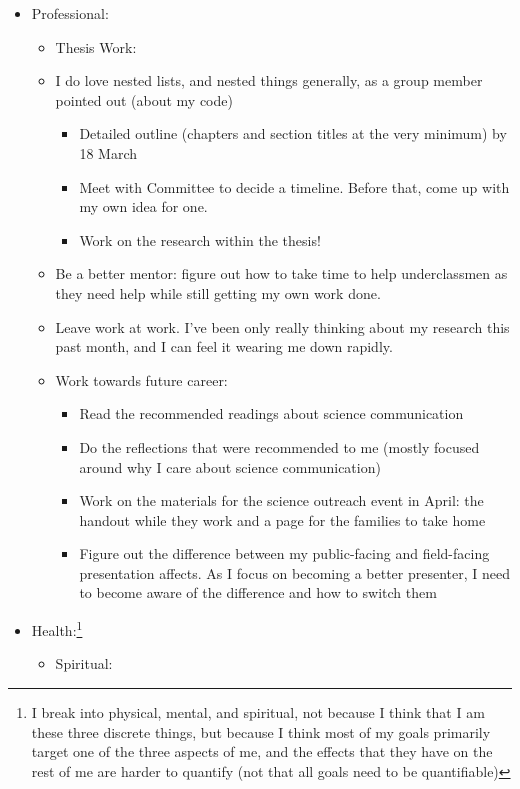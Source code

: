 \documentclass[12pt]{article}[titlepage]
\renewcommand{\,}{\textsuperscript{,}}
\begin{document}
\begin{itemize}  
\item Professional:  
\begin{itemize}  
\item Thesis Work:\item{I do love nested lists, and nested things generally, as a group member pointed out (about my code)}  
\begin{itemize}  
\item Detailed outline (chapters and section titles at the very minimum) by 18 March  
\item Meet with Committee to decide a timeline. Before that, come up with my own idea for one.  
\item Work on the research within the thesis!  
\end{itemize}  
\item Be a better mentor: figure out how to take time to help underclassmen as they need help while still getting my own work done.  
\item Leave work at work. I've been only really thinking about my research this past month, and I can feel it wearing me down rapidly.  
\item Work towards future career:  
\begin{itemize}  
\item Read the recommended readings about science communication  
\item Do the reflections that were recommended to me (mostly focused around why I care about science communication)  
\item Work on the materials for the science outreach event in April: the handout while they work and a page for the families to take home  
\item Figure out the difference between my public-facing and field-facing presentation affects. As I focus on becoming a better presenter, I need to become aware of the difference and how to switch them  
\end{itemize}  
\end{itemize}  
\item Health:\footnote{I break into physical, mental, and spiritual, not because I think that I am these three discrete things, but because I think most of my goals primarily target one of the three aspects of me, and the effects that they have on the rest of me are harder to quantify (not that all goals need to be quantifiable)}  
\begin{itemize}  
\item Spiritual:  

\end{itemize}
\end{itemize}
\end{document}

